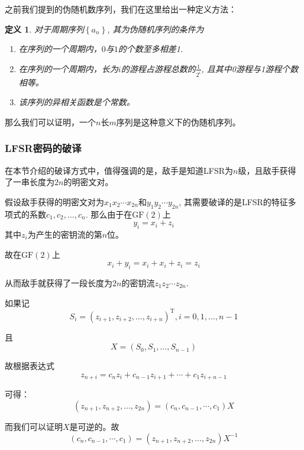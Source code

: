 \documentclass[UTF8]{ctexrep}
\newcommand{\ext}{\displaystyle}
\def\pth#1{\left( {#1}\right)}
\def\brace#1{\left\{ {#1} \right\}}
\def\GF{\mathrm{GF}}
\newtheorem{Definition}{\hspace{2em}定义}[chapter]
\begin{document}
之前我们提到的伪随机数序列，我们在这里给出一种定义方法：
\begin{Definition}
对于周期序列$\brace{a_n}$, 其为伪随机序列的条件为
\begin{enumerate}
    \item 在序列的一个周期内，$0$与$1$的个数至多相差1.
    \item 在序列的一个周期内，长为$i$的游程占游程总数的$\ext\frac{1}{2^i}$, 且其中0游程与1游程个数相等。
    \item 该序列的异相关函数是个常数。
\end{enumerate}
\end{Definition}

那么我们可以证明，一个$n$长$m$序列是这种意义下的伪随机序列。
\subsubsection{LFSR密码的破译}
在本节介绍的破译方式中，值得强调的是，敌手是知道LFSR为$n$级，且敌手获得了一串长度为$2n$的明密文对。\par
假设敌手获得的明密文对为$x_1x_2\cdots x_{2n}$和$y_1y_2\cdots y_{2n}$, 其需要破译的是LFSR的特征多项式的系数$c_1, c_2,\ldots, c_n$. 那么由于在$\GF\pth{2}$上
\[y_i=x_i+z_i\]
其中$z_i$为产生的密钥流的第$n$位。\par
故在$\GF\pth{2}$上
\[x_i+y_i=x_i+x_i+z_i=z_i\]

从而敌手就获得了一段长度为$2n$的密钥流$z_1z_2\cdots z_{2n}$.\par
如果记
\begin{equation}
    S_i=\pth{z_{i+1}, z_{i+2}, \ldots, z_{i+n}}^{\mathrm{T}}, i=0, 1,\ldots, n-1
\end{equation}

且
\begin{equation}
    X=\pth{S_0,S_1,\ldots, S_{n-1}}
\end{equation}

故根据表达式
\begin{equation}
    z_{n+i}=c_nz_{i}+c_{n-1}z_{i+1}+\cdots +c_{1}z_{i+n-1}
\end{equation}

可得：
\begin{equation}
    \pth{z_{n+1}, z_{n+2},\ldots, z_{2n}}=\pth{c_n, c_{n-1}, \cdots ,c_{1}}X
\end{equation}

而我们可以证明$X$是可逆的。故
\begin{equation}
    \pth{c_n, c_{n-1}, \cdots ,c_{1}}=\pth{z_{n+1}, z_{n+2},\ldots, z_{2n}}X^{-1}
\end{equation}
\end{document}
